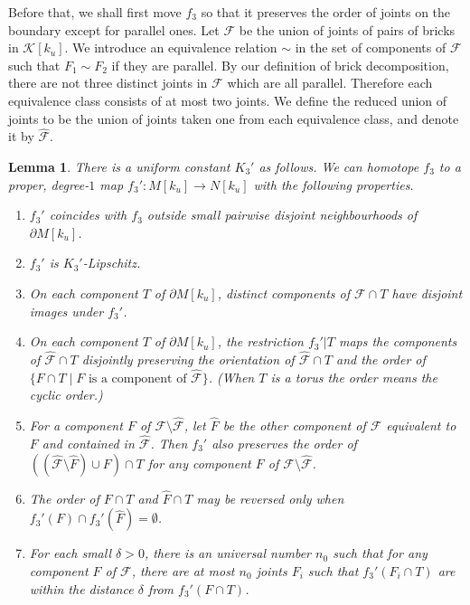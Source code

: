 \documentclass{amsart}
\newtheorem{lemma}[theorem]{Lemma}
\theoremstyle{definition}
\numberwithin{figure}{section}
\numberwithin{equation}{section}
\def\ck{\mathcal{K}}
\begin{document}
Before that, we shall first move $f_3$ so that it preserves the order of joints on the boundary except for parallel ones.
 Let $\mathcal F$ be the union of joints of pairs of bricks in $\ck[k_u]$.
 We introduce an equivalence relation $\sim$ in the set of  components of $\mathcal F$ such that $F_1 \sim F_2$ if they are parallel.
 By our definition of brick decomposition, there are not three distinct joints in $\mathcal F$ which are all parallel.
 Therefore each equivalence class consists of at most two joints.
 We define the reduced union of joints to be the union of joints taken one from each equivalence class, and denote it by $\hat{ \mathcal F}$.
\begin{lemma}
\label{homeo on boundary}
There is a uniform constant $K_3'$ 
 as follows.
We can homotope $f_3$ to a proper, degree-$1$  map $f_3' : M[k_u] \rightarrow N[k_u]$ with the following properties.
\begin{enumerate}[\rm(i)]
\item $f_3'$ coincides with $f_3$ outside small pairwise disjoint neighbourhoods of $\partial M[k_u]$.
\item $f_3'$ is $K_3'$-Lipschitz.
\item On each component $T$ of $\partial M[k_u]$,  distinct components of $\mathcal F \cap T$ have disjoint images under $f_3'$.
\item On each component $T$ of $\partial M[k_u]$, the restriction $f_3'|T$ maps the components of $\hat{\mathcal F} \cap T$ disjointly preserving the orientation of $\hat{\mathcal F}\cap T$ and the order of $\{F \cap T \mid F \text{ is a component of  } \hat{\mathcal F}\}$.
(When $T$ is a torus the order means the cyclic order.)
\item
For a component $F$ of $\mathcal F \setminus \hat{\mathcal F}$, let $\hat F$ be the other component of $\mathcal F$ equivalent to $F$ and contained in $\hat{\mathcal F}$.
Then $f_3'$ also preserves the order of $((\hat{\mathcal F} \setminus \hat F) \cup F)\cap T$ for any component $F$ of $\mathcal F \setminus \hat{\mathcal F}$.
\item
The order of $F\cap T$ and $\hat F \cap T$ may be reversed only when $f_3'(F)\cap f_3'(\hat F)=\emptyset$.
\item For each small $\delta>0$, there is an universal number $n_0$ such that for any component $F$ of $\mathcal F$, there are at most $n_0$ joints $F_i$ such that $f_3'(F_i \cap T)$ are within the distance $\delta$ from $f_3'(F \cap T)$.
\end{enumerate}
\end{lemma}
\end{document}
